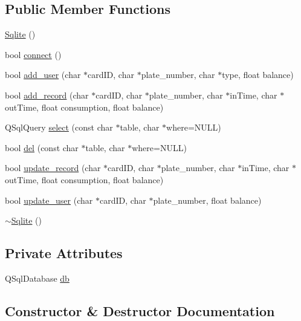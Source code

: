 \subsection*{Public Member Functions}
\begin{DoxyCompactItemize}
\item 
\mbox{\hyperlink{class_sqlite_a8aef4e64531e1522f892c0c6ec69cdff}{Sqlite}} ()
\item 
bool \mbox{\hyperlink{class_sqlite_af3e9ee9a4f73cfc86936a5cdee703c31}{connect}} ()
\item 
bool \mbox{\hyperlink{class_sqlite_a1e45937d38905ad013e0858ad95d5ffd}{add\+\_\+user}} (char $\ast$card\+ID, char $\ast$plate\+\_\+number, char $\ast$type, float balance)
\item 
bool \mbox{\hyperlink{class_sqlite_a128a3fe0ff3ab22960d5e5ec1b5591c3}{add\+\_\+record}} (char $\ast$card\+ID, char $\ast$plate\+\_\+number, char $\ast$in\+Time, char $\ast$out\+Time, float consumption, float balance)
\item 
Q\+Sql\+Query \mbox{\hyperlink{class_sqlite_ae5ba200378ca9bddfe57e2f8421ce949}{select}} (const char $\ast$table, char $\ast$where=N\+U\+LL)
\item 
bool \mbox{\hyperlink{class_sqlite_a30cc57d4645d2e63b3b3ee07f6ab1c94}{del}} (const char $\ast$table, char $\ast$where=N\+U\+LL)
\item 
bool \mbox{\hyperlink{class_sqlite_a4120092c96b9000b83a299d60635f2a3}{update\+\_\+record}} (char $\ast$card\+ID, char $\ast$plate\+\_\+number, char $\ast$in\+Time, char $\ast$out\+Time, float consumption, float balance)
\item 
bool \mbox{\hyperlink{class_sqlite_ae7d3c48b92d42ea9f55b9e8880a8052a}{update\+\_\+user}} (char $\ast$card\+ID, char $\ast$plate\+\_\+number, float balance)
\item 
\mbox{\hyperlink{class_sqlite_adc35a543dca91edc3ffb90a3825dd54a}{$\sim$\+Sqlite}} ()
\end{DoxyCompactItemize}
\subsection*{Private Attributes}
\begin{DoxyCompactItemize}
\item 
Q\+Sql\+Database \mbox{\hyperlink{class_sqlite_afaaed0591ef0d92547dc5f049a22b3a6}{db}}
\end{DoxyCompactItemize}


\subsection{Constructor \& Destructor Documentation}
\mbox{\label{class_sqlite_a8aef4e64531e1522f892c0c6ec69cdff}} 
